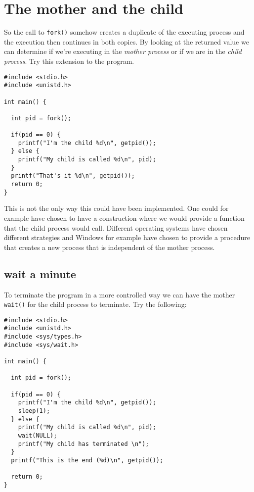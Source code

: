 \documentclass[a4paper,11pt]{article}
\begin{document}
\section{The mother and the child}

So the call to {\tt fork()} somehow creates a duplicate of the
executing process and the execution then continues in both copies. By
looking at the returned value we can determine if we're executing in
the {\em mother process} or if we are in the {\em child process}. Try
this extension to the program.

\begin{lstlisting}
#include <stdio.h>
#include <unistd.h>

int main() {

  int pid = fork();

  if(pid == 0) {
    printf("I'm the child %d\n", getpid());
  } else {
    printf("My child is called %d\n", pid);
  }
  printf("That's it %d\n", getpid());
  return 0;
}
\end{lstlisting}

This is not the only way this could have been implemented. One could
for example have chosen to have a construction where we would provide
a function that the child process would call. Different operating
systems have chosen different strategies and Windows for example have
chosen to provide a procedure that creates a new process that is
independent of the mother process. 

\subsection{wait a minute}

To terminate the program in a more controlled way we can have the mother
{\tt wait()} for the child process to terminate. Try the following:

\begin{lstlisting}
#include <stdio.h>
#include <unistd.h>
#include <sys/types.h>
#include <sys/wait.h>

int main() {

  int pid = fork();

  if(pid == 0) {
    printf("I'm the child %d\n", getpid());
    sleep(1);
  } else {
    printf("My child is called %d\n", pid);
    wait(NULL);
    printf("My child has terminated \n");    
  }
  printf("This is the end (%d)\n", getpid());

  return 0;
}
\end{lstlisting}
\end{document}
